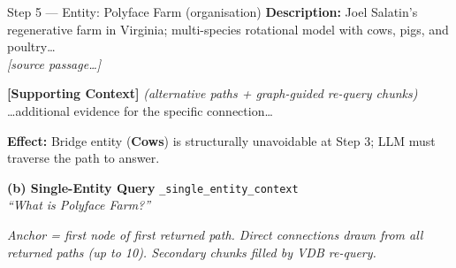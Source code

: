 \documentclass{article}
\newcommand{\passagemark}{\textit{\color{gray}\scriptsize [source passage\ldots]}}
\newcommand{\paneltitle}[3]{%
  \begin{tcolorbox}[
    colback=querybg, colframe=querybg,
    boxrule=0pt, arc=4pt, top=4pt, bottom=4pt, left=6pt, right=6pt]
    {\small\bfseries\sffamily\color{white} #1}
    \hfill{\tiny\sffamily\color{white!70}\texttt{#2}}\\[1pt]
    {\scriptsize\sffamily\color{white!85}\textit{``#3''}}
  \end{tcolorbox}%
}
\begin{document}
\begin{minipage}[t]{0.487\textwidth}
\vspace{3pt}

\begin{entitybox}{Step 5 — Entity: Polyface Farm \normalfont\color{gray}(organisation)}
\scriptsize\sffamily
\textbf{Description:} Joel Salatin's regenerative farm in Virginia; multi-species
rotational model with cows, pigs, and poultry\ldots\\
\passagemark
\end{entitybox}

\vspace{3pt}

\begin{supportbox}
\scriptsize\sffamily\color{gray!80}
\textbf{[Supporting Context]} \textit{(alternative paths + graph-guided re-query chunks)}\\
\ldots additional evidence for the specific connection\ldots
\end{supportbox}

\vspace{4pt}
{\scriptsize\sffamily\color{graspblue!80}
\textbf{Effect:} Bridge entity (\textbf{Cows}) is structurally unavoidable at Step 3;
LLM must traverse the path to answer.}

\vspace{10pt}

\paneltitle{(b) Single-Entity Query}{\_single\_entity\_context}{What is Polyface Farm?}

\vspace{4pt}

{\scriptsize\sffamily\color{gray!60}
\textit{Anchor = first node of first returned path. Direct connections drawn from
all returned paths (up to 10). Secondary chunks filled by VDB re-query.}}

\vspace{4pt}


\end{minipage}
\end{document}

